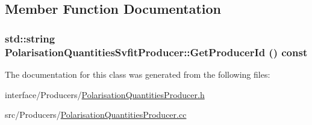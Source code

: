 \subsection{Member Function Documentation}
\hypertarget{classPolarisationQuantitiesSvfitProducer_ab73197d5c7547a3759f1b22d954cfd58}{
\subsubsection[{GetProducerId}]{\setlength{\rightskip}{0pt plus 5cm}std::string PolarisationQuantitiesSvfitProducer::GetProducerId () const}}
\label{classPolarisationQuantitiesSvfitProducer_ab73197d5c7547a3759f1b22d954cfd58}


The documentation for this class was generated from the following files:\begin{DoxyCompactItemize}
\item 
interface/Producers/\hyperlink{PolarisationQuantitiesProducer_8h}{PolarisationQuantitiesProducer.h}\item 
src/Producers/\hyperlink{PolarisationQuantitiesProducer_8cc}{PolarisationQuantitiesProducer.cc}\end{DoxyCompactItemize}
